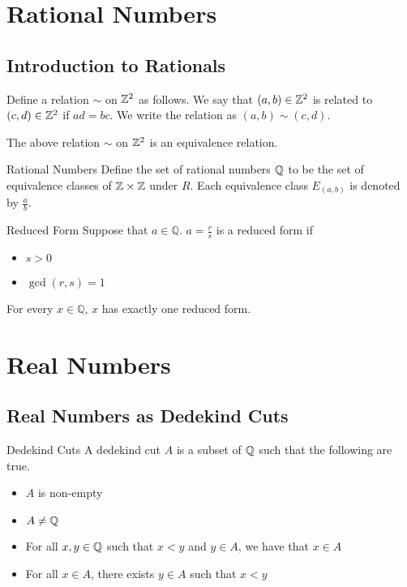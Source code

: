 \documentclass[a4paper]{article}
\begin{document}
\pagebreak
\section{Rational Numbers}
\subsection{Introduction to Rationals}
\begin{defn}{}{} Define a relation $\sim$ on $\mathbb{Z}^2$ as follows. We say that $(a,b)\in\mathbb{Z}^2$ is related to $(c,d)\in\mathbb{Z}^2$ if $ad=bc$. We write the relation as $(a,b)\sim(c,d)$. 
\end{defn}

\begin{lmm}{}{} The above relation $\sim$ on $\mathbb{Z}^2$ is an equivalence relation. 
\end{lmm}

\begin{defn}{Rational Numbers}{} Define the set of rational numbers $\mathbb{Q}$ to be the set of equivalence classes of $\mathbb{Z}\times\mathbb{Z}$ under $R$. Each equivalence class $E_{(a,b)}$ is denoted by $\frac{a}{b}$. 
\end{defn}

\begin{defn}{Reduced Form}{} Suppose that $a\in\mathbb{Q}$. $a=\frac{r}{s}$ is a reduced form if
\begin{itemize}
\item $s>0$
\item $\gcd{(r,s)}=1$
\end{itemize}
\end{defn}

\begin{thm}{}{} For every $x\in\mathbb{Q}$, $x$ has exactly one reduced form. 
\end{thm}

\pagebreak
\section{Real Numbers}
\subsection{Real Numbers as Dedekind Cuts}
\begin{defn}{Dedekind Cuts}{} A dedekind cut $A$ is a subset of $\mathbb{Q}$ such that the following are true. 
\begin{itemize}
\item $A$ is non-empty
\item $A\neq\mathbb{Q}$
\item For all $x,y\in\mathbb{Q}$ such that $x<y$ and $y\in A$, we have that $x\in A$
\item For all $x\in A$, there exists $y\in A$ such that $x<y$
\end{itemize}
\end{defn}
\end{document}
